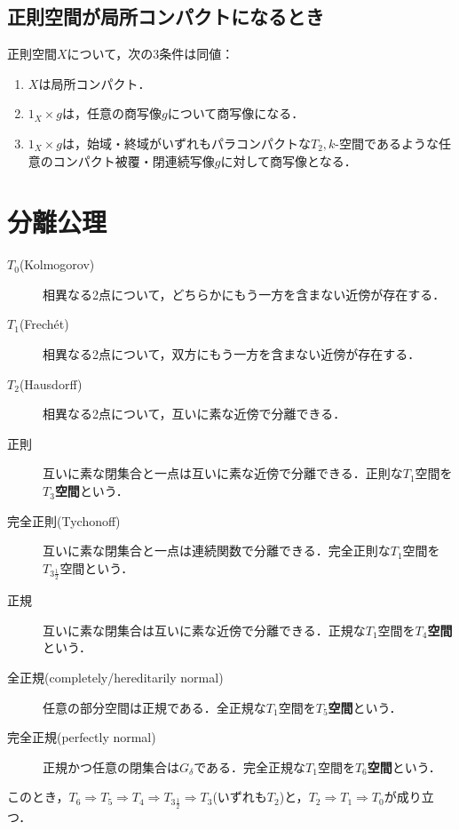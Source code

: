 \documentclass[uplatex,dvipdfmx]{jsreport}
\begin{document}
\subsection{正則空間が局所コンパクトになるとき}

\begin{theorem}
    正則空間$X$について，次の3条件は同値：
    \begin{enumerate}
        \item $X$は局所コンパクト．
        \item $1_X\times g$は，任意の商写像$g$について商写像になる．
        \item $1_X\times g$は，始域・終域がいずれもパラコンパクトな$T_2,k$-空間であるような任意のコンパクト被覆・閉連続写像$g$に対して商写像となる．
    \end{enumerate}
\end{theorem}

\section{分離公理}

\begin{tcolorbox}[colframe=ForestGreen, colback=ForestGreen!10!white,breakable,colbacktitle=ForestGreen!40!white,coltitle=black,fonttitle=\bfseries\sffamily,
title=]
    \begin{description}
        \item[$T_0$(Kolmogorov)] 相異なる2点について，どちらかにもう一方を含まない近傍が存在する．
        \item[$T_1$(Frechét)] 相異なる2点について，双方にもう一方を含まない近傍が存在する．
        \item[$T_2$(Hausdorff)] 相異なる2点について，互いに素な近傍で分離できる．
        \item[正則] 互いに素な閉集合と一点は互いに素な近傍で分離できる．正則な$T_1$空間を\textbf{$T_3$空間}という．
        \item[完全正則(Tychonoff)] 互いに素な閉集合と一点は連続関数で分離できる．完全正則な$T_1$空間を\textbf{$T_{3\frac{1}{2}}$}空間という．
        \item[正規] 互いに素な閉集合は互いに素な近傍で分離できる．正規な$T_1$空間を\textbf{$T_4$空間}という．
        \item[全正規(completely/hereditarily normal)\footnote{\cite{児玉・永見}では全部分正規と呼んでいる}] 任意の部分空間は正規である．全正規な$T_1$空間を\textbf{$T_5$空間}という．
        \item[完全正規(perfectly normal)] 正規かつ任意の閉集合は$G_\delta$である．完全正規な$T_1$空間を\textbf{$T_6$空間}という．
    \end{description}
    このとき，$T_6\Rightarrow T_5\Rightarrow T_4\Rightarrow T_{3\frac{1}{2}}\Rightarrow T_3$(いずれも$T_2$)と，$T_2\Rightarrow T_1\Rightarrow T_0$が成り立つ．
\end{tcolorbox}
\end{document}
